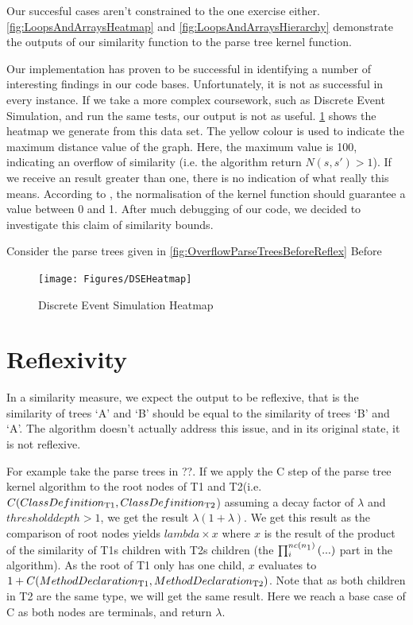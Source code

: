 Our succesful cases aren't constrained to the one exercise either. 
\cref{fig:LoopsAndArraysHeatmap} and \cref{fig:LoopsAndArraysHierarchy}
demonstrate the outputs of our similarity function to the parse tree kernel
function.

Our implementation has proven to be successful in identifying a number of
interesting findings in our code bases. Unfortunately, it is not as successful
in every instance. If we take a more complex coursework, such as Discrete
Event Simulation, and run the same tests, our output is not as useful. 
\cref{fig:DSEHeatmap} shows the heatmap we generate from this data set. The
yellow colour is used to indicate the maximum distance value of the graph. Here,
the maximum value is 100, indicating an overflow of similarity (i.e. the algorithm
return $N(s, s') > 1$). If we receive an result greater than one, there is no
indication of what really this means. According to \cite{ParseTreeKernel},
the normalisation of the kernel function should guarantee a value between 0
and 1. After much debugging of our code, we decided to investigate this claim
of similarity bounds. 

Consider the parse trees given in \cref{fig:OverflowParseTreesBeforeReflex}
Before 

\begin{figure}[H]

	\centering
		\texttt{[image: Figures/DSEHeatmap]}
	\caption{Discrete Event Simulation Heatmap}
	\label{fig:DSEHeatmap}

\end{figure}

\section{Reflexivity}
In a similarity measure, we expect the output to be reflexive, that is the similarity of trees `A' and `B' should be equal to the similarity of trees `B' and `A'. The algorithm doesn’t actually address this issue, and in its original state, it is not reflexive.

For example take the parse trees in ??. If we apply the C step of the parse tree kernel algorithm to the root nodes of T1 and T2(i.e. 
$C(ClassDefinition\textsubscript{T1},ClassDefinition\textsubscript{T2}$) assuming a decay factor of $\lambda$ and $threshold depth > 1$, we get the result $\lambda(1 + \lambda)$. 
We get this result as the comparison of root nodes yields 
$lambda \times x$ where $x$ is the result of the product of the similarity of T1s children
with T2s children (the $\prod_{i}^{nc(n\textsubscript{1})}{(...)}$ part in the algorithm). 
As the root of T1 only has one child, $x$ evaluates to
$1 + C(MethodDeclaration\textsubscript{T1}, MethodDeclaration\textsubscript{T2})$. Note that as both
children in T2 are the same type, we will get the same result. Here we reach
a base case of C as both nodes are terminals, and return $\lambda$.

